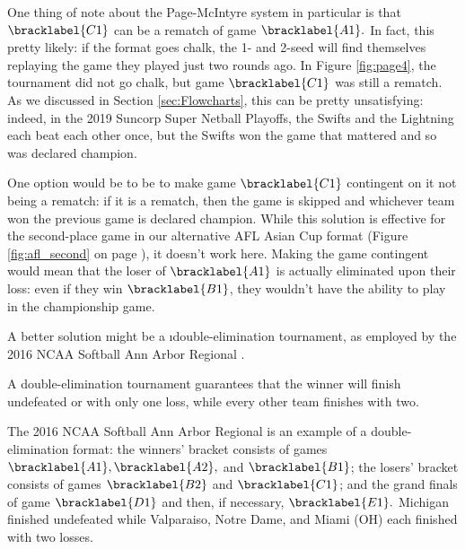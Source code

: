 {    

    One thing of note about the Page-McIntyre system in particular is that $\bracklabel{C1}$ can be a rematch of game $\bracklabel{A1}.$ In fact, this pretty likely: if the format goes chalk, the 1- and 2-seed will find themselves replaying the game they played just two rounds ago. In Figure \ref{fig:page4}, the tournament did not go chalk, but game $\bracklabel{C1}$ was still a rematch. As we discussed in Section \ref{sec:Flowcharts}, this can be pretty unsatisfying: indeed, in the 2019 Suncorp Super Netball Playoffs, the Swifts and the Lightning each beat each other once, but the Swifts won the game that mattered and so was declared champion. 
    
    One option would be to be to make game $\bracklabel{C1}$ contingent on it not being a rematch: if it is a rematch, then the game is skipped and whichever team won the previous game is declared champion. While this solution is effective for the second-place game in our alternative AFL Asian Cup format (Figure \ref{fig:afl_second} on page \pageref{fig:afl_second}), it doesn't work here. Making the game contingent would mean that the loser of $\bracklabel{A1}$ is actually eliminated upon their loss: even if they win $\bracklabel{B1}$, they wouldn't have the ability to play in the championship game.

    A better solution might be a \i{double-elimination tournament}, as employed by the 2016 NCAA Softball Ann Arbor Regional \cite{wiki_soft}.



    A double-elimination tournament guarantees that the winner will finish undefeated or with only one loss, while every other team finishes with two.

    The 2016 NCAA Softball Ann Arbor Regional is an example of a double-elimination format: the winners' bracket consists of games $\bracklabel{A1}, \bracklabel{A2},$ and $\bracklabel{B1}$; the losers' bracket consists of games $\bracklabel{B2}$ and $\bracklabel{C1}$; and the grand finals of game $\bracklabel{D1}$ and then, if necessary, $\bracklabel{E1}.$ Michigan finished undefeated while Valparaiso, Notre Dame, and Miami (OH) each finished with two losses.

}
